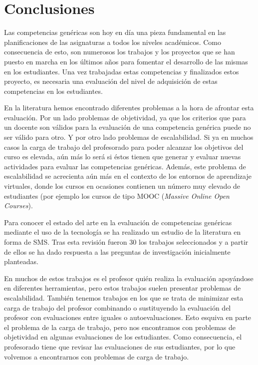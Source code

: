 \section{Conclusiones}

Las competencias genéricas son hoy en día una pieza fundamental en las planificaciones de las asignaturas a todos los niveles académicos. Como consecuencia de esto, son numerosos los trabajos y los proyectos que se han puesto en marcha en los últimos años para fomentar el desarrollo de las mismas en los estudiantes. Una vez trabajadas estas competencias y finalizados estos proyecto, es necesaria una evaluación del nivel de adquisición de estas competencias en los estudiantes.

En la literatura hemos encontrado diferentes problemas a la hora de afrontar esta evaluación. Por un lado problemas de objetividad, ya que los criterios que para un docente son válidos para la evaluación de una competencia genérica puede no ser válido para otro. Y por otro lado problemas de escalabilidad. Si ya en muchos casos la carga de trabajo del profesorado para poder alcanzar los objetivos del curso es elevada, aún más lo será si éstos tienen que generar y evaluar nuevas actividades para evaluar las competencias genéricas. Además, este problema de escalabilidad se acrecienta aún más en el contexto de los entornos de aprendizaje virtuales, donde los cursos en ocasiones contienen un número muy elevado de estudiantes (por ejemplo los cursos de tipo MOOC (\emph{Massive Online Open Courses}).

Para conocer el estado del arte en la evaluación de competencias genéricas mediante el uso de la tecnología se ha realizado un estudio de la literatura en forma de SMS. Tras esta revisión fueron 30 los trabajos seleccionados y a partir de ellos se ha dado respuesta a las preguntas de investigación inicialmente planteadas.

En muchos de estos trabajos es el profesor quién realiza la evaluación apoyándose en diferentes herramientas, pero estos trabajos suelen presentar problemas de escalabilidad. También tenemos trabajos en los que se trata de minimizar esta carga de trabajo del profesor combinando o sustituyendo la evaluación del profesor con evaluaciones entre iguales o autoevaluaciones. Esto esquiva en parte el problema de la carga de trabajo, pero nos encontramos con problemas de objetividad en algunas evaluaciones de los estudiantes. Como consecuencia, el profesorado tiene que revisar las evaluaciones de sus estudiantes, por lo que volvemos a encontrarnos con problemas de carga de trabajo.

